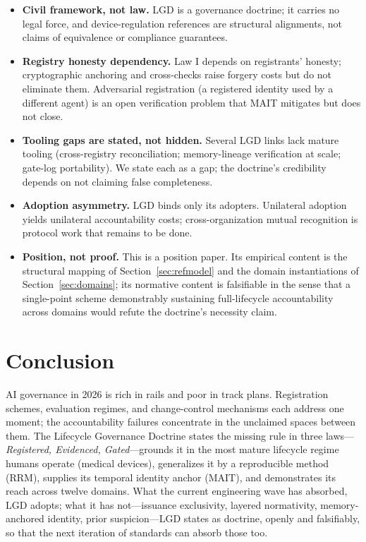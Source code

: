\documentclass[12pt]{article}
\begin{document}
\begin{itemize}[itemsep=2pt]
  \item \textbf{Civil framework, not law.} LGD is a governance doctrine; it carries no legal force, and device-regulation references are structural alignments, not claims of equivalence or compliance guarantees.
  \item \textbf{Registry honesty dependency.} Law I depends on registrants' honesty; cryptographic anchoring and cross-checks raise forgery costs but do not eliminate them. Adversarial registration (a registered identity used by a different agent) is an open verification problem that MAIT mitigates but does not close.
  \item \textbf{Tooling gaps are stated, not hidden.} Several LGD links lack mature tooling (cross-registry reconciliation; memory-lineage verification at scale; gate-log portability). We state each as a gap; the doctrine's credibility depends on not claiming false completeness.
  \item \textbf{Adoption asymmetry.} LGD binds only its adopters. Unilateral adoption yields unilateral accountability costs; cross-organization mutual recognition is protocol work that remains to be done.
  \item \textbf{Position, not proof.} This is a position paper. Its empirical content is the structural mapping of Section~\ref{sec:refmodel} and the domain instantiations of Section~\ref{sec:domains}; its normative content is falsifiable in the sense that a single-point scheme demonstrably sustaining full-lifecycle accountability across domains would refute the doctrine's necessity claim.
\end{itemize}

\section{Conclusion}

AI governance in 2026 is rich in rails and poor in track plans. Registration schemes, evaluation regimes, and change-control mechanisms each address one moment; the accountability failures concentrate in the unclaimed spaces between them. The Lifecycle Governance Doctrine states the missing rule in three laws---\emph{Registered, Evidenced, Gated}---grounds it in the most mature lifecycle regime humans operate (medical devices), generalizes it by a reproducible method (RRM), supplies its temporal identity anchor (MAIT), and demonstrates its reach across twelve domains. What the current engineering wave has absorbed, LGD adopts; what it has not---issuance exclusivity, layered normativity, memory-anchored identity, prior suspicion---LGD states as doctrine, openly and falsifiably, so that the next iteration of standards can absorb those too.
\end{document}
